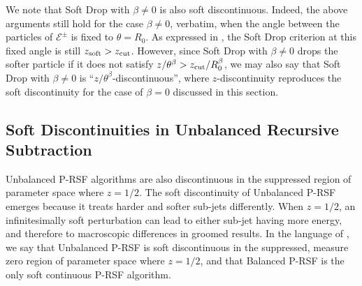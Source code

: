 We note that Soft Drop with \(\beta \neq 0\) is also soft discontinuous.
%
Indeed, the above arguments still hold for the case \(\beta \neq 0\), verbatim, when the angle between the particles of \(\mathcal E^\pm\) is fixed to \(\theta = R_0\).
%
As expressed in , the Soft Drop criterion at this fixed angle is still \(z_{\rm soft} > z_{\rm cut}\).
%
However, since Soft Drop with \(\beta \neq 0\) drops the softer particle if it does not satisfy \(z / \theta^{\beta} > z_{\rm cut}/ R_0^\beta\), we may also say that Soft Drop with \(\beta \neq 0\) is ``\(z / \theta^{\beta}\)-discontinuous'', where \(z\)-discontinuity reproduces the soft discontinuity for the case of \(\beta = 0\) discussed in this section.




\subsection{Soft Discontinuities in Unbalanced Recursive Subtraction}
\label{sec:rsf_discont}

Unbalanced P-RSF algorithms are also discontinuous in the suppressed region of parameter space where \(z = 1/2\).
%
The soft discontinuity of Unbalanced P-RSF emerges because it treats harder and softer sub-jets differently.
%
When \(z = 1/2\), an infinitesimally soft perturbation can lead to either sub-jet having more energy, and therefore to macroscopic differences in groomed results.
%
In the language of , we say that Unbalanced P-RSF is soft discontinuous in the suppressed, measure zero region of parameter space where \(z = 1/2\), and that Balanced P-RSF is the only soft continuous P-RSF algorithm.

